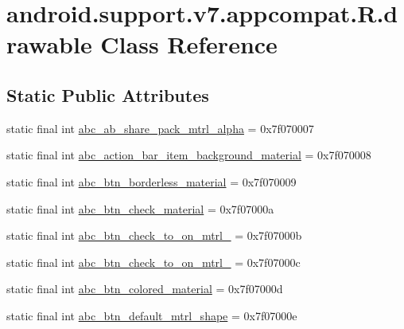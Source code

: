 \hypertarget{classandroid_1_1support_1_1v7_1_1appcompat_1_1_r_1_1drawable}{}\section{android.\+support.\+v7.\+appcompat.\+R.\+drawable Class Reference}
\label{classandroid_1_1support_1_1v7_1_1appcompat_1_1_r_1_1drawable}
\subsection*{Static Public Attributes}
\begin{DoxyCompactItemize}
\item 
static final int \mbox{\hyperlink{classandroid_1_1support_1_1v7_1_1appcompat_1_1_r_1_1drawable_a2617cd3cc5fd99bf8702673e973c716d}{abc\+\_\+ab\+\_\+share\+\_\+pack\+\_\+mtrl\+\_\+alpha}} = 0x7f070007
\item 
static final int \mbox{\hyperlink{classandroid_1_1support_1_1v7_1_1appcompat_1_1_r_1_1drawable_a48cb66511eb88f80686a25611e677bd3}{abc\+\_\+action\+\_\+bar\+\_\+item\+\_\+background\+\_\+material}} = 0x7f070008
\item 
static final int \mbox{\hyperlink{classandroid_1_1support_1_1v7_1_1appcompat_1_1_r_1_1drawable_ad3b42c47b3c3ed014fd375136c62b76b}{abc\+\_\+btn\+\_\+borderless\+\_\+material}} = 0x7f070009
\item 
static final int \mbox{\hyperlink{classandroid_1_1support_1_1v7_1_1appcompat_1_1_r_1_1drawable_ad54104f0bfce1e7c5fa5f887c153557a}{abc\+\_\+btn\+\_\+check\+\_\+material}} = 0x7f07000a
\item 
static final int \mbox{\hyperlink{classandroid_1_1support_1_1v7_1_1appcompat_1_1_r_1_1drawable_a45c3ee07ad24f689749d83dccb1efe64}{abc\+\_\+btn\+\_\+check\+\_\+to\+\_\+on\+\_\+mtrl\+\_}} = 0x7f07000b
\item 
static final int \mbox{\hyperlink{classandroid_1_1support_1_1v7_1_1appcompat_1_1_r_1_1drawable_aa0d4e39356c8f7a8c87c6c74809e1e06}{abc\+\_\+btn\+\_\+check\+\_\+to\+\_\+on\+\_\+mtrl\+\_}} = 0x7f07000c
\item 
static final int \mbox{\hyperlink{classandroid_1_1support_1_1v7_1_1appcompat_1_1_r_1_1drawable_aedfa71414c1ad5fbc62fef5c218ff93c}{abc\+\_\+btn\+\_\+colored\+\_\+material}} = 0x7f07000d
\item 
static final int \mbox{\hyperlink{classandroid_1_1support_1_1v7_1_1appcompat_1_1_r_1_1drawable_a498dee9d40c49a9928e85e8005f6f642}{abc\+\_\+btn\+\_\+default\+\_\+mtrl\+\_\+shape}} = 0x7f07000e

\end{DoxyCompactItemize}
